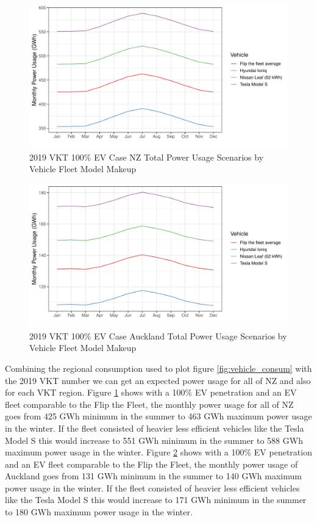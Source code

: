 \documentclass[
]{article}
\begin{document}
\begin{figure}
\centering
\includegraphics{summary_week4_files/figure-latex/vehicle_power_usage-1.pdf}
\caption{2019 VKT 100\% EV Case NZ Total Power Usage Scenarios by
Vehicle Fleet Model Makeup\label{fig:vehicle_power_usage}}
\end{figure}

\begin{figure}
\centering
\includegraphics{summary_week4_files/figure-latex/vehicle_power_usage_auck-1.pdf}
\caption{2019 VKT 100\% EV Case Auckland Total Power Usage Scenarios by
Vehicle Fleet Model Makeup\label{fig:vehicle_power_usage_auck}}
\end{figure}

Combining the regional consumption used to plot figure
\ref{fig:vehicle_consum} with the 2019 VKT number we can get an expected
power usage for all of NZ and also for each VKT region. Figure
\ref{fig:vehicle_power_usage} shows with a 100\% EV penetration and an
EV fleet comparable to the Flip the Fleet, the monthly power usage for
all of NZ goes from 425 GWh minimum in the summer to 463 GWh maximum
power usage in the winter. If the fleet consisted of heavier less
efficient vehicles like the Tesla Model S this would increase to 551 GWh
minimum in the summer to 588 GWh maximum power usage in the winter.
Figure \ref{fig:vehicle_power_usage_auck} shows with a 100\% EV
penetration and an EV fleet comparable to the Flip the Fleet, the
monthly power usage of Auckland goes from 131 GWh minimum in the summer
to 140 GWh maximum power usage in the winter. If the fleet consisted of
heavier less efficient vehicles like the Tesla Model S this would
increase to 171 GWh minimum in the summer to 180 GWh maximum power usage
in the winter.
\end{document}
